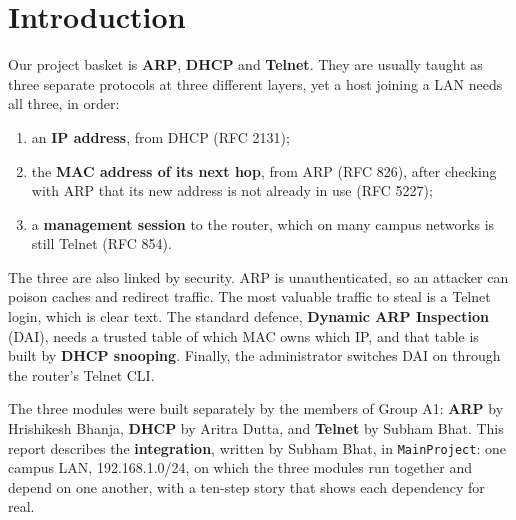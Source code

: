 \documentclass[11pt,a4paper]{article}
\begin{document}
\section{Introduction}
\noindent Our project basket is \textbf{ARP}, \textbf{DHCP} and \textbf{Telnet}. They are usually taught as three separate protocols at three different layers, yet a host joining a LAN needs all three, in order:
\begin{enumerate}[leftmargin=2em]
    \item an \textbf{IP address}, from DHCP (RFC 2131);
    \item the \textbf{MAC address of its next hop}, from ARP (RFC 826), after checking with ARP that its new address is not already in use (RFC 5227);
    \item a \textbf{management session} to the router, which on many campus networks is still Telnet (RFC 854).
\end{enumerate}
The three are also linked by security. ARP is unauthenticated, so an attacker can poison caches and redirect traffic. The most valuable traffic to steal is a Telnet login, which is clear text. The standard defence, \textbf{Dynamic ARP Inspection} (DAI), needs a trusted table of which MAC owns which IP, and that table is built by \textbf{DHCP snooping}. Finally, the administrator switches DAI on through the router's Telnet CLI.

The three modules were built separately by the members of Group A1: \textbf{ARP} by Hrishikesh Bhanja, \textbf{DHCP} by Aritra Dutta, and \textbf{Telnet} by Subham Bhat. This report describes the \textbf{integration}, written by Subham Bhat, in \texttt{MainProject}: one campus LAN, 192.168.1.0/24, on which the three modules run together and depend on one another, with a ten-step story that shows each dependency for real.
\end{document}
